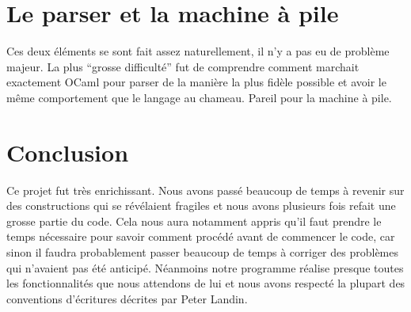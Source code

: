 \documentclass[10pt,a4paper]{article}
\begin{document}
\section{Le parser et la machine à pile}
Ces deux éléments se sont fait assez naturellement, il n'y a pas eu de problème majeur. La plus ``grosse difficulté'' fut de comprendre comment marchait exactement OCaml pour parser de la manière la plus fidèle possible et avoir le même comportement que le langage au chameau. Pareil pour la machine à pile.

\section{Conclusion}
Ce projet fut très enrichissant. Nous avons passé beaucoup de temps à revenir sur des constructions qui se révélaient fragiles et nous avons plusieurs fois refait une grosse partie du code. Cela nous aura notamment appris qu'il faut prendre le temps nécessaire pour savoir comment procédé avant de commencer le code, car sinon il faudra probablement passer beaucoup de temps à corriger des problèmes qui n'avaient pas été anticipé. Néanmoins notre programme réalise presque toutes les fonctionnalités que nous attendons de lui et nous avons respecté la plupart des conventions d'écritures décrites par Peter Landin.
\end{document}
